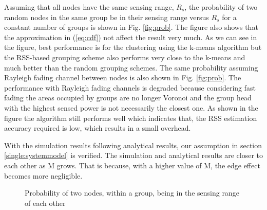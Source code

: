 Assuming that all nodes have the same sensing range, $R_s$, the probability of two random nodes in the same group be in their sensing range versus $R_s$ for a constant number of groups is shown in Fig. \ref{fig:prob}. The figure also shows that the approximation in (\ref{eq:cdf}) not affect the result very much. As we can see in the figure, best performance is for the clustering using the k-means algorithm but the RSS-based grouping scheme also performs very close to the k-means and much better than the random grouping schemes. The same probability assuming Rayleigh fading channel between nodes is also shown in Fig. \ref{fig:prob}. The performance with Rayleigh fading channels is degraded because considering fast fading the areas occupied by groups are no longer Voronoi and the group head with the highest sensed power is not necessarily the closest one. As shown in the figure the algorithm still performs well which indicates that, the RSS estimation accuracy required is low, which results in a small overhead.

With the simulation results following analytical results, our assumption in section \ref{single:systemmodel} is verified. The simulation and analytical results are closer to each other as M grows. That is because, with a higher value of M, the edge effect becomes more negligible.


\begin{figure} [th]
  \centering
  \caption{Probability of two nodes, within a group, being in the sensing range of each other}
  \label{fig:probabilities}
\end{figure}


